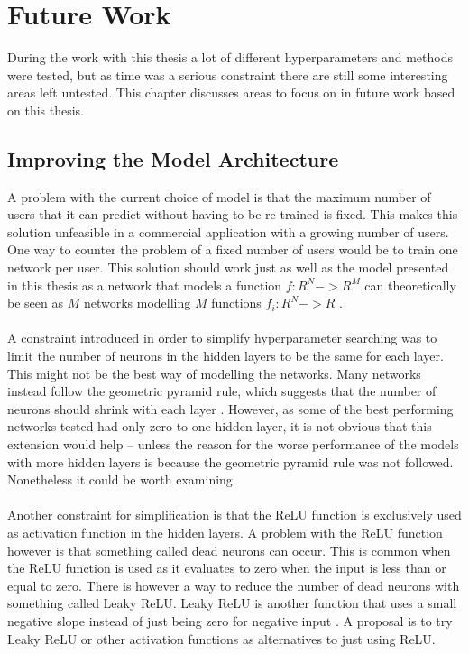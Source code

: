 \chapter{Future Work}\label{chap:future_work}
During the work with this thesis a lot of different hyperparameters and methods were tested, but as time was a serious constraint there are still some interesting areas left untested. This chapter discusses areas to focus on in future work based on this thesis.

\section{Improving the Model Architecture}\label{sec:improving_arch}
A problem with the current choice of model is that the maximum number of users that it can predict without having to be re-trained is fixed. This makes this solution unfeasible in a commercial application with a growing number of users. One way to counter the problem of a fixed number of users would be to train one network per user. This solution should work just as well as the model presented in this thesis as a network that models a function $f:R^N->R^M$ can theoretically be seen as $M$ networks modelling $M$ functions $f_i:R^N->R$ \parencite{leshno1993multilayer}.
\\\\
A constraint introduced in order to simplify hyperparameter searching was to limit the number of neurons in the hidden layers to be the same for each layer. This might not be the best way of modelling the networks. Many networks instead follow the geometric pyramid rule, which suggests that the number of neurons should shrink with each layer \parencite{masters1993practical}. However, as some of the best performing networks tested had only zero to one hidden layer, it is not obvious that this extension would help -- unless the reason for the worse performance of the models with more hidden layers is because the geometric pyramid rule was not followed. Nonetheless it could be worth examining.
\\\\
Another constraint for simplification is that the ReLU function is exclusively used as activation function in the hidden layers. A problem with the ReLU function however is that something called dead neurons can occur. This is common when the ReLU function is used as it evaluates to zero when the input is less than or equal to zero. There is however a way to reduce the number of dead neurons with something called Leaky ReLU. Leaky ReLU is another function that uses a small negative slope instead of just being zero for negative input \parencite{maas2013rectifier}. A proposal is to try Leaky ReLU or other activation functions as alternatives to just using ReLU.

